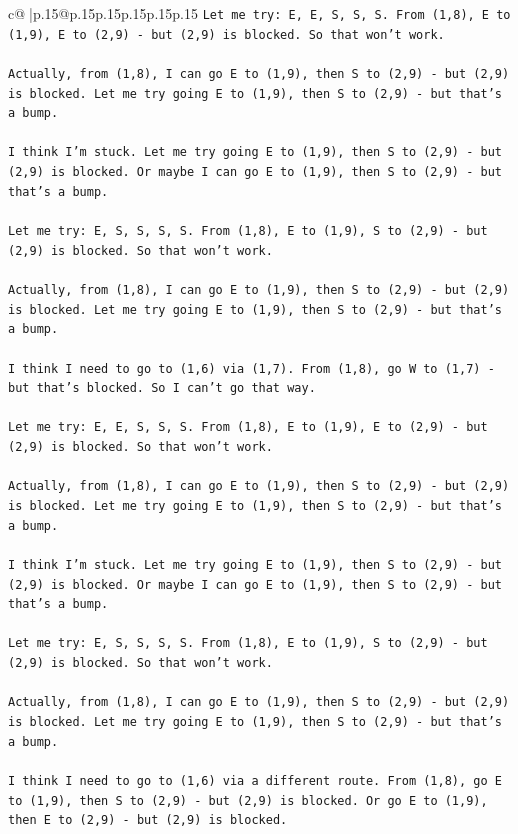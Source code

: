 \documentclass{article}
\begin{document}
{\begin{supertabular}{c@{$\;$}|p{.15\linewidth}@{}p{.15\linewidth}p{.15\linewidth}p{.15\linewidth}p{.15\linewidth}p{.15\linewidth}}
{{{\texttt{Let me try: E, E, S, S, S. From (1,8), E to (1,9), E to (2,9) {-} but (2,9) is blocked. So that won't work.} \\
\\ 
\texttt{Actually, from (1,8), I can go E to (1,9), then S to (2,9) {-} but (2,9) is blocked. Let me try going E to (1,9), then S to (2,9) {-} but that's a bump.} \\
\\ 
\texttt{I think I'm stuck. Let me try going E to (1,9), then S to (2,9) {-} but (2,9) is blocked. Or maybe I can go E to (1,9), then S to (2,9) {-} but that's a bump.} \\
\\ 
\texttt{Let me try: E, S, S, S, S. From (1,8), E to (1,9), S to (2,9) {-} but (2,9) is blocked. So that won't work.} \\
\\ 
\texttt{Actually, from (1,8), I can go E to (1,9), then S to (2,9) {-} but (2,9) is blocked. Let me try going E to (1,9), then S to (2,9) {-} but that's a bump.} \\
\\ 
\texttt{I think I need to go to (1,6) via (1,7). From (1,8), go W to (1,7) {-} but that's blocked. So I can't go that way.} \\
\\ 
\texttt{Let me try: E, E, S, S, S. From (1,8), E to (1,9), E to (2,9) {-} but (2,9) is blocked. So that won't work.} \\
\\ 
\texttt{Actually, from (1,8), I can go E to (1,9), then S to (2,9) {-} but (2,9) is blocked. Let me try going E to (1,9), then S to (2,9) {-} but that's a bump.} \\
\\ 
\texttt{I think I'm stuck. Let me try going E to (1,9), then S to (2,9) {-} but (2,9) is blocked. Or maybe I can go E to (1,9), then S to (2,9) {-} but that's a bump.} \\
\\ 
\texttt{Let me try: E, S, S, S, S. From (1,8), E to (1,9), S to (2,9) {-} but (2,9) is blocked. So that won't work.} \\
\\ 
\texttt{Actually, from (1,8), I can go E to (1,9), then S to (2,9) {-} but (2,9) is blocked. Let me try going E to (1,9), then S to (2,9) {-} but that's a bump.} \\
\\ 
\texttt{I think I need to go to (1,6) via a different route. From (1,8), go E to (1,9), then S to (2,9) {-} but (2,9) is blocked. Or go E to (1,9), then E to (2,9) {-} but (2,9) is blocked.} \\
}}}
\end{supertabular}}
\end{document}

